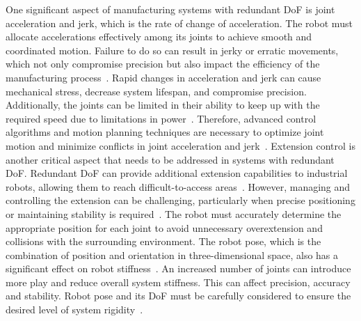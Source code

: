 







One significant aspect of manufacturing systems with redundant DoF is joint acceleration and jerk, which is the rate of change of acceleration. The robot must allocate accelerations effectively among its joints to achieve smooth and coordinated motion. Failure to do so can result in jerky or erratic movements, which not only compromise precision but also impact the efficiency of the manufacturing process~\cite{Duong.2021}. Rapid changes in acceleration and jerk can cause mechanical stress, decrease system lifespan, and compromise precision. Additionally, the joints can be limited in their ability to keep up with the required speed due to limitations in power~\cite{Staff.1988}. Therefore, advanced control algorithms and motion planning techniques are necessary to optimize joint motion and minimize conflicts in joint acceleration and jerk~\cite{Duong.2021, Valente.2017}.
\newpage
Extension control is another critical aspect that needs to be addressed in systems with redundant DoF. Redundant DoF can provide additional extension capabilities to industrial robots, allowing them to reach difficult-to-access areas~\cite{Duong.2021}. However, managing and controlling the extension can be challenging, particularly when precise positioning or maintaining stability is required~\cite{Lin.2022}.
The robot must accurately determine the appropriate position for each joint to avoid unnecessary overextension and collisions with the surrounding environment. The robot pose, which is the combination of position and orientation in three-dimensional space, also has a significant effect on robot stiffness~\cite{Xiong.2019}. An increased number of joints can introduce more play and reduce overall system stiffness. This can affect precision, accuracy and stability. Robot pose and its DoF must be carefully considered to ensure the desired level of system rigidity~\cite{Liu.2022, Shi.2021}.


